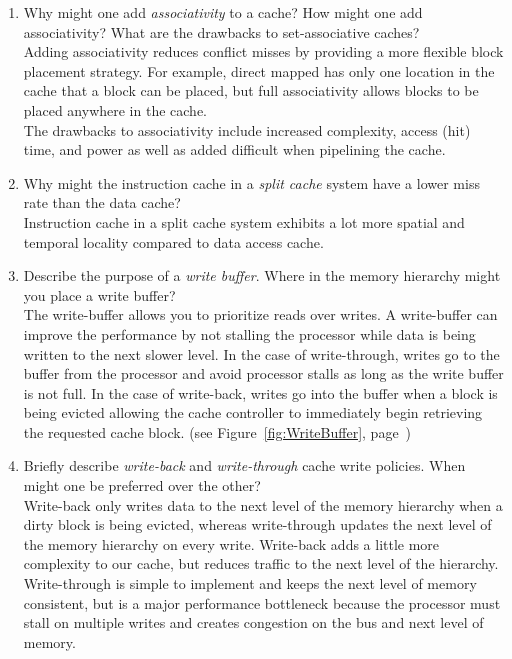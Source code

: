 \documentclass[11pt]{article}
\begin{document}
\begin{enumerate}
\begin{enumerate}
        \item Why might one add \textit{associativity} to a cache? How might one add associativity? What are the drawbacks to set-associative caches?\\[1em]
        Adding associativity reduces conflict misses by providing a more flexible block placement strategy. For example, direct mapped has only one location in the cache that a block can be placed, but full associativity allows blocks to be placed anywhere in the cache.\\

        The drawbacks to associativity include increased complexity, access (hit) time, and power as well as added difficult when pipelining the cache.\\

        \item Why might the instruction cache in a \textit{split cache} system have a lower miss rate than the data cache?\\[1em]
        Instruction cache in a split cache system exhibits a lot more spatial and temporal locality compared to data access cache.\\

        \item Describe the purpose of a \textit{write buffer}. Where in the memory hierarchy might you place a write buffer?\\[1em]
        The write-buffer allows you to prioritize reads over writes. A write-buffer can improve the performance by not stalling the processor while data is being written to the next slower level. In the case of write-through, writes go to the buffer from the processor and avoid processor stalls as long as the write buffer is not full. In the case of write-back, writes go into the buffer when a block is being evicted allowing the cache controller to immediately begin retrieving the requested cache block. (see Figure~\ref{fig:WriteBuffer}, page~\pageref{fig:WriteBuffer})\\

        \item Briefly describe \textit{write-back} and \textit{write-through} cache write policies. When might one be preferred over the other?\\[1em]
        Write-back only writes data to the next level of the memory hierarchy when a dirty block is being evicted, whereas write-through updates the next level of the memory hierarchy on every write. Write-back adds a little more complexity to our cache, but reduces traffic to the next level of the hierarchy. Write-through is simple to implement and keeps the next level of memory consistent, but is a major performance bottleneck because the processor must stall on multiple writes and creates congestion on the bus and next level of memory.\\


\end{enumerate}
\end{enumerate}
\end{document}
